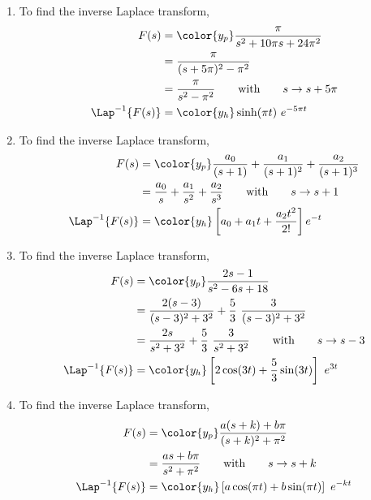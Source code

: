 \begin{enumerate}
      \item To find the inverse Laplace transform,
            \begin{align}
                  F(s)              & = \color{y_p} \frac{\pi}
                  {s^2 + 10\pi s + 24\pi^2}                                    \\
                                    & = \frac{\pi}{(s+5\pi)^2 - \pi^2}         \\
                                    & = \frac{\pi}{s^2 - \pi^2}
                  \qquad \text{with} \qquad s \rightarrow s+5\pi               \\
                  \Lap^{-1}\{F(s)\} & =  \color{y_h} \sinh(\pi t)\ e^{-5\pi t}
            \end{align}

      \item To find the inverse Laplace transform,
            \begin{align}
                  F(s)              & = \color{y_p} \frac{a_0}{(s+1)}
                  + \frac{a_1}{(s+1)^2} + \frac{a_2}{(s+1)^3}                   \\
                                    & = \frac{a_0}{s} + \frac{a_1}{s^2}
                  + \frac{a_2}{s^3} \qquad \text{with} \qquad s \rightarrow s+1 \\
                  \Lap^{-1}\{F(s)\} & =  \color{y_h} \left[
                        a_0 + a_1t + \frac{a_2t^2}{2!}  \right]e^{-t}
            \end{align}

      \item To find the inverse Laplace transform,
            \begin{align}
                  F(s)              & = \color{y_p} \frac{2s-1}
                  {s^2 - 6s + 18}                                    \\
                                    & = \frac{2(s-3)}{(s-3)^2 + 3^2}
                  + \frac{5}{3}\ \frac{3}{(s-3)^2 + 3^2}             \\
                                    & = \frac{2s}{s^2 + 3^2}
                  + \frac{5}{3}\ \frac{3}{s^2 + 3^2}
                  \qquad \text{with} \qquad s \rightarrow s-3        \\
                  \Lap^{-1}\{F(s)\} & =  \color{y_h} \left[2\cos(3t)
                        + \frac{5}{3}\sin(3t)\right]\ e^{3t}
            \end{align}

      \item To find the inverse Laplace transform,
            \begin{align}
                  F(s)              & = \color{y_p} \frac{a(s+k) + b\pi}
                  {(s+k)^2 + \pi^2}                                      \\
                                    & = \frac{as + b\pi}{s^2 + \pi^2}
                  \qquad \text{with} \qquad s \rightarrow s+k            \\
                  \Lap^{-1}\{F(s)\} & =  \color{y_h} \left[a\cos(\pi t)
                        + b\sin(\pi t)\right]\ e^{-kt}
            \end{align}



\end{enumerate}
